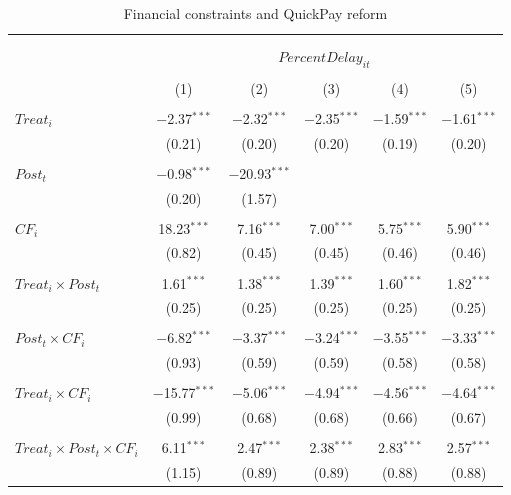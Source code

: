 \documentclass[
]{article}
\begin{document}
\begin{table}[H] \centering 
  \caption{Financial constraints and QuickPay reform} 
  \label{} 
\small 
\begin{tabular}{@{\extracolsep{-2pt}}lccccc} 
\\[-1.8ex]\hline 
\hline \\[-1.8ex] 
\\[-1.8ex] & \multicolumn{5}{c}{$PercentDelay_{it}$  } \\ 
\\[-1.8ex] & (1) & (2) & (3) & (4) & (5)\\ 
\hline \\[-1.8ex] 
 $Treat_i$ & $-$2.37$^{***}$ & $-$2.32$^{***}$ & $-$2.35$^{***}$ & $-$1.59$^{***}$ & $-$1.61$^{***}$ \\ 
  & (0.21) & (0.20) & (0.20) & (0.19) & (0.20) \\ 
  & & & & & \\ 
 $Post_t$ & $-$0.98$^{***}$ & $-$20.93$^{***}$ &  &  &  \\ 
  & (0.20) & (1.57) &  &  &  \\ 
  & & & & & \\ 
 $CF_i$ & 18.23$^{***}$ & 7.16$^{***}$ & 7.00$^{***}$ & 5.75$^{***}$ & 5.90$^{***}$ \\ 
  & (0.82) & (0.45) & (0.45) & (0.46) & (0.46) \\ 
  & & & & & \\ 
 $Treat_i \times Post_t$ & 1.61$^{***}$ & 1.38$^{***}$ & 1.39$^{***}$ & 1.60$^{***}$ & 1.82$^{***}$ \\ 
  & (0.25) & (0.25) & (0.25) & (0.25) & (0.25) \\ 
  & & & & & \\ 
 $Post_t \times CF_i$ & $-$6.82$^{***}$ & $-$3.37$^{***}$ & $-$3.24$^{***}$ & $-$3.55$^{***}$ & $-$3.33$^{***}$ \\ 
  & (0.93) & (0.59) & (0.59) & (0.58) & (0.58) \\ 
  & & & & & \\ 
 $Treat_i \times CF_i$ & $-$15.77$^{***}$ & $-$5.06$^{***}$ & $-$4.94$^{***}$ & $-$4.56$^{***}$ & $-$4.64$^{***}$ \\ 
  & (0.99) & (0.68) & (0.68) & (0.66) & (0.67) \\ 
  & & & & & \\ 
 $Treat_i \times Post_t \times CF_i$ & 6.11$^{***}$ & 2.47$^{***}$ & 2.38$^{***}$ & 2.83$^{***}$ & 2.57$^{***}$ \\ 
  & (1.15) & (0.89) & (0.89) & (0.88) & (0.88) \\ 

\end{tabular}
\end{table}
\end{document}
